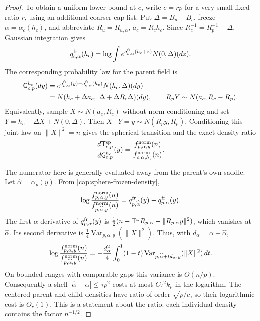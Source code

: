 \begin{proof}
To obtain a uniform lower bound at \(c\), write \(c=rp\) for a very small
fixed ratio \(r\), using an additional coarser cap list. Put
\(\Delta=B_p-B_c\), freeze \(\alpha=\alpha_c(h_c)\), and abbreviate
\(R_u=R_{u,\alpha}\), \(a_c=R_ch_c\). Since
\(R_c^{-1}=R_p^{-1}-\Delta\), Gaussian integration gives
\[
 q_{c,\alpha}^{\rm fr}(h_c)
 =\log\int e^{q_{p,\alpha}^{\rm fr}(h_c+z)}N(0,\Delta)(dz).
\]
The corresponding probability law for the parent field is
\begin{equation}\label{cap:static-canonical-bridge}
 \begin{split}
 \mathsf G_{c,p}^{h_c}(dy)
 &=e^{q_{p,\alpha}^{\rm fr}(y)-q_{c,\alpha}^{\rm fr}(h_c)}
                  N(h_c,\Delta)(dy)\\
 &=N(h_c+\Delta a_c,\ \Delta+\Delta R_c\Delta)(dy),\qquad
 R_pY\sim N(a_c,R_c-R_p).
 \end{split}
\end{equation}
Equivalently, sample \(X\sim N(a_c,R_c)\) without norm conditioning and set
\(Y=h_c+\Delta X+N(0,\Delta)\). Then
\(X\mid Y=y\sim N(R_py,R_p)\). Conditioning this joint law on
\(\|X\|^2=n\) gives the spherical transition and the exact density ratio
\begin{equation}\label{cap:spherical-bridge-ratio}
 \frac{d\mathsf T_{c,p}^{\rm sp}}{d\mathsf G_{c,p}^{h_c}}(y)
 =\frac{f_{p,\alpha,y}^{\rm norm}(n)}
        {f_{c,\alpha,h_c}^{\rm norm}(n)} .
\end{equation}

The numerator here is generally evaluated away from the parent's own
saddle. Let \(\widehat\alpha=\alpha_p(y)\). From
\eqref{cap:sphere-frozen-density},
\[
 \log\frac{f_{p,\alpha,y}^{\rm norm}(n)}
              {f_{p,\widehat\alpha,y}^{\rm norm}(n)}
 =q_{p,\widehat\alpha}^{\rm fr}(y)-q_{p,\alpha}^{\rm fr}(y).
\]
The first \(\alpha\)-derivative of \(q_{p,\alpha}^{\rm fr}(y)\) is
\(\tfrac12(n-\operatorname{Tr} R_{p,\alpha}-\|R_{p,\alpha}y\|^2)\), which vanishes at
\(\widehat\alpha\). Its second derivative is
\(\tfrac14\operatorname{Var}_{p,\alpha,y}(\|X\|^2)\). Thus, with
\(d_\alpha=\alpha-\widehat\alpha\),
\begin{equation}\label{cap:off-saddle-density}
 \log\frac{f_{p,\alpha,y}^{\rm norm}(n)}
              {f_{p,\widehat\alpha,y}^{\rm norm}(n)}
 =-\frac{d_\alpha^2}{4}\int_0^1(1-t)
  \operatorname{Var}_{p,\widehat\alpha+t d_\alpha,y}(\|X\|^2)\,dt .
\end{equation}
On bounded ranges with comparable gaps this variance is \(O(n/p)\).
Consequently a shell \(|\widehat\alpha-\alpha|\le\tau p^2\) costs at most
\(C\tau^2k_p\) in the logarithm. The centered parent and child densities
have ratio of order \(\sqrt{p/c}\), so their logarithmic cost is \(O_r(1)\).
This is a statement about the ratio: each individual density contains the
factor \(n^{-1/2}\).


\end{proof}
